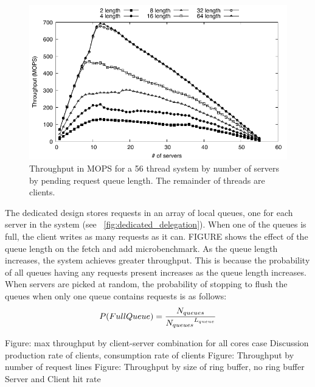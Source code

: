\documentclass{uicthesi}
\begin{document}
\begin{figure}[ht!]
\centering
\includegraphics[width=0.9\columnwidth]{FIG/vary_queue_length.pdf}
\caption{Throughput in MOPS for a 56 thread system by number of servers by pending request queue length. The remainder of threads are clients.}
\label{fig:dedicated_vary_queue}
\end{figure}

The dedicated design stores requests in an array of local queues, one for each server in the system (see ~\ref{fig:dedicated_delegation}).  When one of the queues is full, the client writes as many requests as it can.  FIGURE shows the effect of the queue length on the fetch and add microbenchmark. As the queue length increases, the system achieves greater throughput. This is because the probability of all queues having any requests present increases as the queue length increases. When servers are picked at random, the probability of stopping to flush the queues when only one queue contains requests is as follows: 
\begin{displaymath}
P(Full Queue) = {N_{queues} \over {N_{queues}}^{L_{queue}}}
\end{displaymath}



Figure: max throughput by client-server combination for all cores case
	Discussion production rate of clients, consumption rate of clients
Figure: Throughput by number of request lines
Figure: Throughput by size of ring buffer, no ring buffer
	Server and Client hit rate
\end{document}

